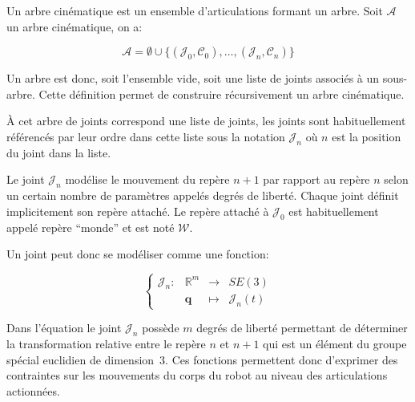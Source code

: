 \begin{mydef}
  Un arbre cinématique est un ensemble
  d'articulations
  formant un arbre. Soit $\mathcal{A}$ un arbre cinématique, on a:

  \begin{equation}
    \mathcal{A} = \emptyset \cup \{ (\mathcal{J}_0, \mathcal{C}_0),
    \dotsc, (\mathcal{J}_n, \mathcal{C}_n) \}
  \end{equation}

  Un arbre est donc, soit l'ensemble vide, soit une liste de joints
  associés à un sous-arbre. Cette définition permet de construire
  récursivement un arbre cinématique.

  À cet arbre de joints correspond une liste de joints, les joints
  sont habituellement référencés par leur ordre dans cette liste sous
  la notation $\mathcal{J}_n$ où $n$ est la position du joint dans la
  liste.
\end{mydef}

\begin{mydef}
  Le joint $\mathcal{J}_n$ modélise le mouvement du repère $n+1$ par
  rapport au repère $n$ selon un certain nombre de paramètres appelés
  degrés de liberté. Chaque joint définit implicitement son repère
  attaché. Le repère attaché à $\mathcal{J}_0$ est habituellement
  appelé repère ``monde'' et est noté $\mathcal{W}$.

  Un joint peut donc se modéliser comme une fonction:

  \begin{equation}
    \left\{
    \begin{array}{cccc}
      \mathcal{J}_n : & \mathbb{R}^m & \rightarrow & SE(3)\\
      & \mathbf{q} & \mapsto & \mathcal{J}_n(t)
    \end{array}
    \right.
  \end{equation}

  Dans l'équation le joint $\mathcal{J}_n$ possède $m$ degrés de
  liberté permettant de déterminer la transformation relative entre le
  repère $n$ et $n + 1$ qui est un élément du groupe spécial euclidien
  de dimension 3. Ces fonctions permettent donc d'exprimer des
  contraintes sur les mouvements du corps du robot au niveau des
  articulations actionnées.
\end{mydef}

